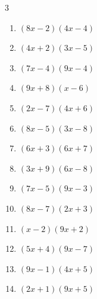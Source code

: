 \begin{multicols}{3}
\begin{enumerate}

  \item $(8x-2)(4x-4)$


  \item $(4x+2)(3x-5)$


  \item $(7x-4)(9x-4)$


  \item $(9x+8)(x-6)$


  \item $(2x-7)(4x+6)$


  \item $(8x-5)(3x-8)$


\columnbreak %

\resetques

  \item $(6x+3)(6x+7)$


  \item $(3x+9)(6x-8)$


  \item $(7x-5)(9x-3)$


  \item $(8x-7)(2x+3)$


  \item $(x-2)(9x+2)$


  \item $(5x+4)(9x-7)$


  \item $(9x-1)(4x+5)$


  \item $(2x+1)(9x+5)$


\end{enumerate}
\end{multicols}
